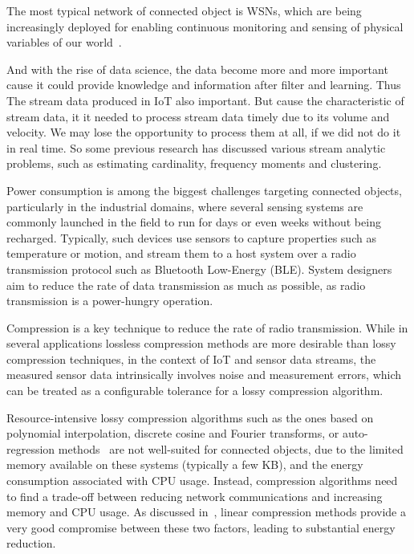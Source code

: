 The most typical network of connected object is WSNs, which are being
increasingly deployed for enabling continuous monitoring and sensing of physical
variables of our world~\cite{li2016temporal}.

And with the rise of data science, the data become more and more important cause
it could provide knowledge and information after filter and learning. Thus The
stream data produced in IoT also important. But cause the characteristic of
stream data, it it needed to process stream data timely due to its volume and
velocity. We may lose the opportunity to process them at all, if we did not do
it in real time. So some previous research has discussed various stream analytic
problems, such as estimating cardinality, frequency moments and clustering.

Power consumption is among the biggest challenges targeting connected 
objects, particularly in the industrial domains, where several sensing 
systems are commonly launched in the field to run for days or even 
weeks without being recharged. Typically, such devices use sensors to 
capture properties such as temperature or motion, and stream them to a 
host system over a radio transmission protocol such as Bluetooth 
Low-Energy (BLE). System designers aim to reduce the rate of data 
transmission as much as possible, as radio transmission is a 
power-hungry operation.

Compression is a key technique to reduce the rate of radio 
transmission.  While in several applications lossless compression 
methods are more desirable than lossy compression techniques, in the 
context of IoT and sensor data streams, the measured sensor data 
intrinsically involves noise and measurement errors, which can 
be treated as a configurable tolerance for a lossy compression algorithm. 

Resource-intensive lossy compression algorithms such as the ones based on 
polynomial interpolation, discrete cosine and Fourier transforms, or 
auto-regression methods~\cite{lu2010optimized} are not well-suited for 
connected objects, due to the limited memory available on 
these systems (typically a few KB), and the energy consumption 
associated with CPU usage. Instead, compression algorithms need 
to find a trade-off between reducing network communications and 
increasing memory and CPU usage. As 
discussed in~\cite{zordan2014performance}, linear compression methods 
provide a very good compromise between these two factors, leading to 
substantial energy reduction.
